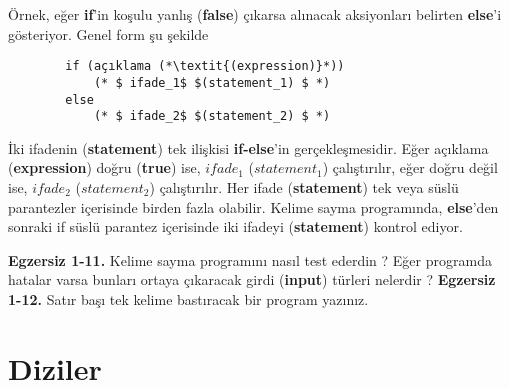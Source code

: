 \documentclass[a4paper,12pt,oneside]{book}
\begin{document}
\par Örnek, eğer \textbf{if}'in koşulu yanlış (\textbf{false}) çıkarsa alınacak aksiyonları belirten \textbf{else}'i gösteriyor. Genel form şu şekilde
\begin{lstlisting}
		if (açıklama (*\textit{(expression)}*))
			(* $ ifade_1$ $(statement_1) $ *)
		else
			(* $ ifade_2$ $(statement_2) $ *)

\end{lstlisting}
\noindent İki ifadenin (\textbf{statement}) tek ilişkisi \textbf{if-else}'in gerçekleşmesidir. Eğer açıklama (\textbf{expression}) doğru (\textbf{true}) ise, $ ifade_1 $ (\textbf{$ statement_1 $}) çalıştırılır, eğer doğru değil ise, $ ifade_2 $ ($ statement_2 $) çalıştırılır. Her ifade (\textbf{statement}) tek veya süslü parantezler içerisinde birden fazla olabilir. Kelime sayma programında, \textbf{else}'den sonraki if süslü parantez içerisinde iki ifadeyi (\textbf{statement}) kontrol ediyor. \newline

\noindent \textbf{Egzersiz 1-11.} Kelime sayma programını nasıl test ederdin ? Eğer programda hatalar varsa bunları ortaya çıkaracak girdi (\textbf{input}) türleri nelerdir ? \newline
\newline \textbf{Egzersiz 1-12.} Satır başı tek kelime bastıracak bir program yazınız.

\section{Diziler}
\end{document}
